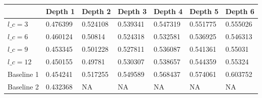 \begin{tabular}{lllllll}
\toprule
{} &   Depth 1 &   Depth 2 &   Depth 3 &   Depth 4 &   Depth 5 &   Depth 6 \\
\midrule
$l\_c=3$    &  0.476399 &  0.524108 &  0.539341 &  0.547319 &  0.551775 &  0.555026 \\
$l\_c=6$    &  0.460124 &   0.50814 &  0.524318 &  0.532581 &  0.536925 &  0.546313 \\
$l\_c=9$    &  0.453345 &  0.501228 &  0.527811 &  0.536087 &  0.541361 &   0.55031 \\
$l\_c=12$   &  0.450155 &   0.49781 &  0.530307 &  0.538657 &  0.544359 &   0.55324 \\
Baseline 1 &  0.454241 &  0.517255 &  0.549589 &  0.568437 &  0.574061 &  0.603752 \\
Baseline 2 &  0.432368 &        NA &        NA &        NA &        NA &        NA \\
\bottomrule
\end{tabular}
